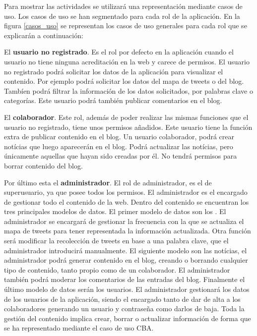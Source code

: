 Para mostrar las actividades se utilizará una representación mediante casos de uso. Los casos de uso se han segmentado para cada rol de la aplicación.
En la figura \ref{casos_uso}  se representan los casos de uso generales para cada rol que se explicarán a continuación:

\vspace{5 mm}

El \textbf{usuario no registrado}. Es el rol por defecto en la aplicación cuando el usuario no tiene ninguna acreditación en la web y carece de permisos.
El usuario no registrado podrá solicitar los datos de la aplicación para visualizar el contenido. Por ejemplo podrá solicitar los datos del mapa de tweets o
del blog. Tambíen podrá filtrar la información de los datos solicitados, por palabras clave o categorías. Este usuario podrá también publicar comentarios en el blog.

\vspace{5 mm}

El \textbf{colaborador}. Este rol, además de poder realizar las mismas funciones que el usuario no registrado, tiene unos permisos añadidos. Este usuario tiene la función extra de publicar contenido en el blog. Un usuario colaborador, podrá crear notícias que luego aparecerán en el blog. Podrá actualizar las notícias, pero únicamente aquellas que hayan sido creadas por él. No tendrá permisos para borrar contenido del blog.

\vspace{5 mm}

Por último esta el \textbf{administrador}. El rol de administrador, es el de superusuario, ya que posee todos los permisos. El administrador es el encargado de gestionar todo el contenido de la web. Dentro del contenido se encuentran los tres principales modelos de datos. El primer modelo de datos son los . El administrador se encargará de gestionar la frecuencia con la que se actualiza el mapa de tweets para tener representada la información actualizada. Otra función será modificar la recolección de tweets en base a una palabra clave, que el administrador introducirá manualmente. El siguiente modelo son las notícias, el administrador podrá generar contenido en el blog, creando o borrando cualquier tipo de contenido, tanto propio como de un colaborador. El administrador también podrá moderar los comentarios de las entradas del blog. Finalmente el último modelo de datos serán los usuarios. El administrador gestionará los datos de los usuarios de la aplicación, siendo el encargado tanto de dar de alta a los colaboradores generando un usuario y contraseña como darlos de baja. Toda la gestión del contenido implica crear, borrar o actualizar información de forma que se ha representado mediante el caso de uso CBA.


